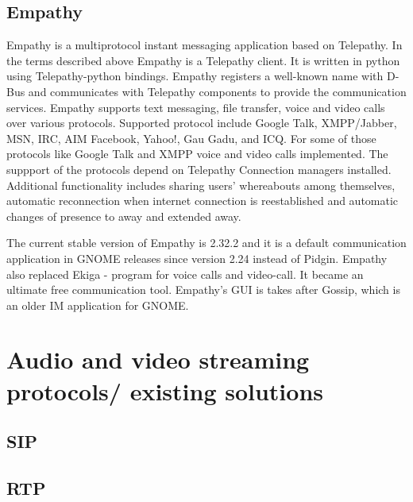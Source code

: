 \section{Empathy}
Empathy is a multiprotocol instant messaging application based on Telepathy. In the terms described above Empathy is a Telepathy client. It is written in python using Telepathy-python bindings. Empathy registers a well-known name with D-Bus and communicates with Telepathy components to provide the communication services. Empathy supports text messaging, file transfer, voice and video calls over various protocols. Supported protocol include Google Talk, XMPP/Jabber, MSN, IRC, AIM Facebook, Yahoo!, Gau Gadu, and ICQ. For some of those protocols like Google Talk and XMPP voice and video calls implemented. The suppport of the protocols depend on Telepathy Connection managers installed. Additional functionality includes sharing users' whereabouts among themselves, automatic reconnection when internet connection is reestablished and automatic changes of presence to away and extended away.\cite{empathyGnome}

The current stable version of Empathy is 2.32.2 and it is a default communication application in GNOME releases since version 2.24 instead of Pidgin. Empathy also replaced Ekiga - program for voice calls and video-call. It became an ultimate free communication tool. Empathy's GUI is takes after Gossip, which is an older IM application for GNOME. 


\chapter{Audio and video streaming protocols/ existing solutions}
\section{SIP}
\section{RTP}



